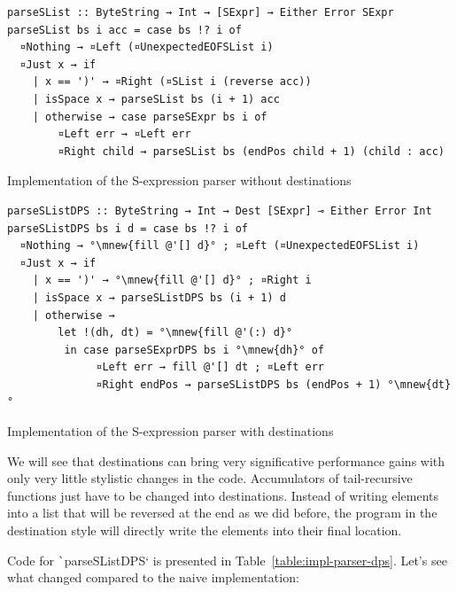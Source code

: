 \documentclass[english]{jflart}
\newcommand{\mnew}[1]{\colorbox{green!50}{#1}}
\begin{document}
\begin{table}[t]
\small
\begin{verbatim}
parseSList :: ByteString → Int → [SExpr] → Either Error SExpr
parseSList bs i acc = case bs !? i of
  ¤Nothing → ¤Left (¤UnexpectedEOFSList i)
  ¤Just x → if
    | x == ')' → ¤Right (¤SList i (reverse acc))
    | isSpace x → parseSList bs (i + 1) acc
    | otherwise → case parseSExpr bs i of
        ¤Left err → ¤Left err
        ¤Right child → parseSList bs (endPos child + 1) (child : acc)
\end{verbatim}
\caption{Implementation of the S-expression parser without destinations}
\label{table:impl-parser-naive}

\bigskip

\small
\begin{verbatim}
parseSListDPS :: ByteString → Int → Dest [SExpr] ⊸ Either Error Int
parseSListDPS bs i d = case bs !? i of
  ¤Nothing → °\mnew{fill @'[] d}° ; ¤Left (¤UnexpectedEOFSList i)
  ¤Just x → if
    | x == ')' → °\mnew{fill @'[] d}° ; ¤Right i
    | isSpace x → parseSListDPS bs (i + 1) d
    | otherwise →
        let !(dh, dt) = °\mnew{fill @'(:) d}°
         in case parseSExprDPS bs i °\mnew{dh}° of
              ¤Left err → fill @'[] dt ; ¤Left err
              ¤Right endPos → parseSListDPS bs (endPos + 1) °\mnew{dt}°
\end{verbatim}
\caption{Implementation of the S-expression parser with destinations}
\label{table:impl-parser-dps}
\end{table}

We will see that destinations can bring very significative performance gains with only very little stylistic changes in the code. Accumulators of tail-recursive functions just have to be changed into destinations. Instead of writing elements into a list that will be reversed at the end as we did before, the program in the destination style will directly write the elements into their final location.

Code for \texttt`parseSListDPS` is presented in Table~\ref{table:impl-parser-dps}. Let's see what changed compared to the naive implementation:
\end{document}

